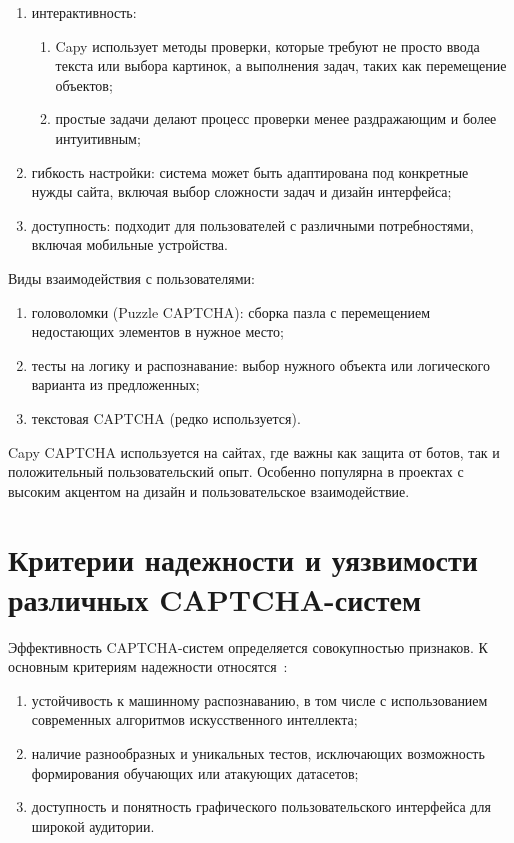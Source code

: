 \begin{enumerate}
    \item интерактивность:
    \begin{enumerate}
        \item Capy использует методы проверки, которые требуют не просто ввода 
        текста или выбора картинок, а выполнения задач, таких как перемещение 
        объектов;
        \item простые задачи делают процесс проверки менее раздражающим и более 
        интуитивным;
    \end{enumerate}
    \item гибкость настройки: система может быть адаптирована под конкретные 
    нужды сайта, включая выбор сложности задач и дизайн интерфейса;
    \item доступность: подходит для пользователей с различными потребностями, 
    включая мобильные устройства.
\end{enumerate}

Виды взаимодействия с пользователями:

\begin{enumerate}
    \item головоломки (Puzzle CAPTCHA): сборка пазла с перемещением недостающих 
    элементов в нужное место;
    \item тесты на логику и распознавание: выбор нужного объекта или 
    логического варианта из предложенных;
    \item текстовая CAPTCHA (редко используется).
\end{enumerate}

Capy CAPTCHA используется на сайтах, где важны как защита от ботов, так и 
положительный пользовательский опыт. Особенно популярна в проектах с высоким 
акцентом на дизайн и пользовательское взаимодействие.

\section{Критерии надежности и уязвимости различных CAPTCHA-систем}

Эффективность CAPTCHA-систем определяется совокупностью признаков. К основным 
критериям надежности относятся~\cite{captchawiki}:

\begin{enumerate}
    \item устойчивость к машинному распознаванию, в том числе с использованием 
    современных алгоритмов искусственного интеллекта;
    \item наличие разнообразных и уникальных тестов, исключающих возможность 
    формирования обучающих или атакующих датасетов;
    \item доступность и понятность графического пользовательского интерфейса для 
    широкой аудитории.
\end{enumerate}

